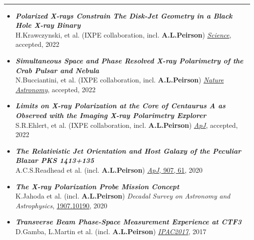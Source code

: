 \documentclass[11 pt,oneside]{article}
\newenvironment{ressection}[1]{
	\vspace{4pt}
	{\selectfont\Large\color{Mycolor2}{\textbf{#1}}}
	\vspace{-6.5pt} \\
	\textcolor{Mycolor2}{\rule{\textwidth}{0.7pt}}
	\begin{itemize}
	\vspace{3pt}
}{
	\end{itemize}
}
\newcommand{\resitem}[1]{
	\vspace{-4pt}
	\item[] \begin{flushleft} #1 \end{flushleft}
}
\newenvironment{ressubsecPu}[1]{
	\resitem{#1}
	\vspace{2pt}

}
\newif\ifacademia
\begin{document}
\begin{ressection}{\textbf{Publications}}
\begin{ressubsecPu}{\textbf{\emph{Polarized X-rays Constrain The Disk-Jet Geometry in a Black Hole X-ray Binary}}\\ H.Krawczynski, et al. (IXPE collaboration, incl. \textbf{A.L.Peirson}) \href{https://arxiv.org/abs/2206.09972}{\emph{Science}}, accepted, 2022}
\end{ressubsecPu}
\vspace{2pt}

\begin{ressubsecPu}{\textbf{\emph{Simultaneous Space and Phase Resolved X-ray Polarimetry of the Crab Pulsar and Nebula}}\\ N.Bucciantini, et al. (IXPE collaboration, incl. \textbf{A.L.Peirson}) \href{https://arxiv.org/abs/2207.05573}{\emph{Nature Astronomy}}, accepted, 2022}
\end{ressubsecPu}
\vspace{2pt}

\begin{ressubsecPu}{\textbf{\emph{Limits on X-ray Polarization at the Core of Centaurus A as Observed with the Imaging X-ray Polarimetry Explorer}}\\ S.R.Ehlert, et al. (IXPE collaboration, incl. \textbf{A.L.Peirson}) \href{https://arxiv.org/abs/2207.06625}{\emph{ApJ}}, accepted, 2022}
\end{ressubsecPu}
\vspace{2pt}

\begin{ressubsecPu}{\textbf{\emph{The Relativistic Jet Orientation and Host Galaxy of the Peculiar Blazar PKS 1413+135}}\\ A.C.S.Readhead et al. (incl. \textbf{A.L.Peirson}) \href{http://arxiv.org/abs/2012.04045}{\emph{ApJ}, 907, 61}, 2020}
\end{ressubsecPu}
\vspace{2pt}

\ifacademia
\else
\begin{ressubsecPu}{\textbf{\emph{The X-ray Polarization Probe Mission Concept}}\\ K.Jahoda et al. (incl. \textbf{A.L.Peirson}) \emph{Decadal Survey on Astronomy and Astrophysics}, \href{https://arxiv.org/abs/1907.10190}{1907.10190}, 2020}
\end{ressubsecPu}
\vspace{2pt}
\fi

\begin{ressubsecPu}{\textbf{\emph{Transverse Beam Phase-Space Measurement Experience at CTF3}}\\ D.Gamba, L.Martin et al. (incl. \textbf{A.L.Peirson}) \href{http://accelconf.web.cern.ch/ipac2017/doi/JACoW-IPAC2017-MOPAB115.html}{\emph{IPAC2017}}, 2017}
\end{ressubsecPu}

\end{ressection}
\end{document}

